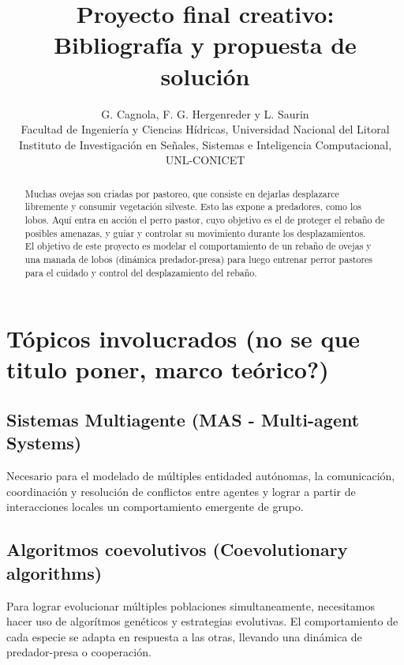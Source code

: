 \documentclass[final]{article}
\begin{document}
\def\tablename{Tabla}          %

\title{Proyecto final creativo:\\
    Bibliografía y propuesta de solución}

\author{G. Cagnola, F. G. Hergenreder y L. Saurin \\
        Facultad de Ingeniería y Ciencias Hídricas,
        Universidad Nacional del Litoral \\
        Instituto de Investigación en Señales, Sistemas e Inteligencia Computacional, UNL-CONICET}

\maketitle

\begin{abstract}
Muchas ovejas son criadas por pastoreo, que consiste en dejarlas desplazarce libremente y consumir vegetación silveste.
Esto las expone a predadores, como los lobos. Aquí entra en acción el perro pastor, cuyo objetivo es el de proteger el rebaño
de posibles amenazas, y guiar y controlar su movimiento durante los desplazamientos.\\
El objetivo de este proyecto es modelar el comportamiento de un rebaño de ovejas y una manada de lobos (dinámica predador-presa)
para luego entrenar perror pastores para el cuidado y control del desplazamiento del rebaño.
\end{abstract}

\section{Tópicos involucrados (no se que titulo poner, marco teórico?)}

\subsection{Sistemas Multiagente (MAS - Multi-agent Systems)}
Necesario para el modelado de múltiples entidaded autónomas, la comunicación, coordinación y resolución de conflictos entre agentes y
lograr a partir de interacciones locales un comportamiento emergente de grupo.

\subsection{Algoritmos coevolutivos (Coevolutionary algorithms)}
Para lograr evolucionar múltiples poblaciones simultaneamente, necesitamos hacer uso de algorítmos genéticos y estrategias evolutivas.
El comportamiento de cada especie se adapta en respuesta a las otras, llevando una dinámica de predador-presa o cooperación.
\end{document}
